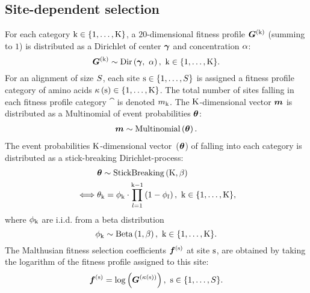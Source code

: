 \subsection{Site-dependent selection}
\label{sec:profiles}
For each category $\text{k} \in \{1, \hdots, \text{K}\}$, a $20$-dimensional fitness profile $\bm{G}^{(\text{k})}$ (summing to $1$) is distributed as a Dirichlet of center $\bm{\gamma}$ and concentration $\alpha$:
\begin{equation}
    \label{eq:DistribBase}
    \Base\catexp \sim \mathrm{Dir}\left( \Basecenter,\ \baseconc \right),\ \Setcat.
\end{equation}
For an alignment of size $S$, each site $\text{s} \in \{1, \hdots, S\}$ is assigned a fitness profile category of amino acids $\kappa\left(\text{s}\right) \in \{1, \hdots, \text{K}\} $.
The total number of sites falling in each fitness profile category $\cat$ is denoted $m_{\text{k}}$.
The $\text{K}$-dimensional vector $\bm{m}$ is distributed as a Multinomial of event probabilities $\bm{\theta}$:
\begin{align}
    \label{eq:DistribMultinomial}
    \catMultiVar \sim \mathrm{Multinomial}\left( \StickBreaking \right).
\end{align}
The event probabilities $\text{K}$-dimensional vector~($\bm{\theta}$) of falling into each category is distributed as a stick-breaking \gls{Dirichlet-process}:
\begin{align}
    \label{eq:DistribStickBreaking}
    \begin{split}
        & \StickBreaking \sim \mathrm{StickBreaking}\left( \Ncat, \stickbreakinghyper \right)\\
        \iff & \stickbreaking_{\cat} = \stick_{\cat}\cdot \prod _{{\indice=1}}^{{\cat-1}}\left(1-\stick_{\indice}\right),\ \Setcat,
    \end{split}
\end{align}
where $\phi_{\text{k}}$ are i.i.d.
from a beta distribution
\begin{equation}
    \label{eq:Beta}
    \stick_{\cat} \sim \mathrm{Beta}\left( 1, \stickbreakinghyper \right),\ \Setcat.
\end{equation}
The Malthusian fitness selection coefficients $\bm{f}^{(\text{s})}$ at site $\text{s}$, are obtained by taking the logarithm of the fitness profile assigned to this site:
\begin{equation}
    \label{eq:sitefitness}
    \Fit\siteexp = \log \left( \Base^{\left( \catsite \right)} \right),\ \Setsite.
\end{equation}

